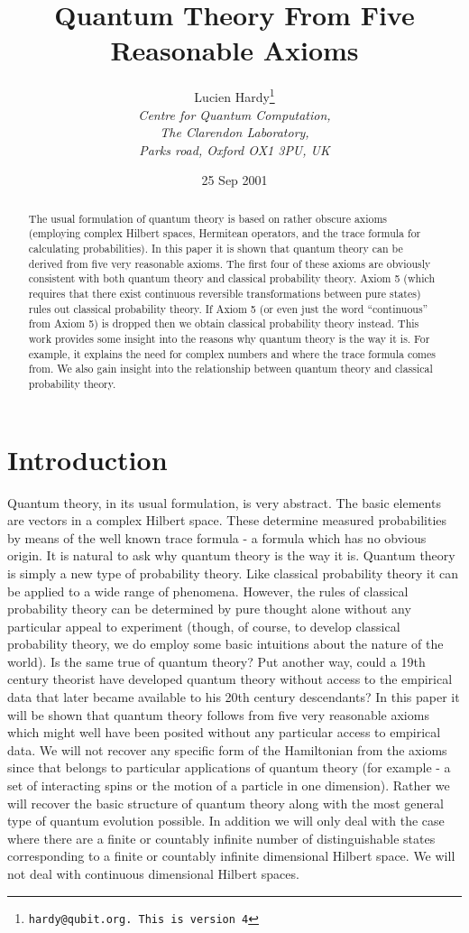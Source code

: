 \documentclass[12pt]{article}
\title{\textbf{Quantum Theory From Five Reasonable Axioms}}
\author{Lucien Hardy\thanks{\texttt{hardy@qubit.org.  This is version
4}}\\
\textit{Centre for Quantum Computation,}\\
\textit{The Clarendon Laboratory,}\\
\textit{Parks road, Oxford OX1 3PU, UK}}
\date{25 Sep 2001}
\begin{document}
\maketitle

\begin{abstract}
The usual formulation of quantum theory is based on rather obscure axioms
(employing complex Hilbert spaces, Hermitean operators, and the trace
formula for calculating probabilities).
In this paper it is shown that quantum theory can be derived from five
very reasonable axioms. The first four of these axioms are obviously
consistent with both quantum theory and classical probability theory.
Axiom 5 (which requires that there exist continuous reversible
transformations between pure states) rules out classical probability
theory.  If Axiom 5 (or even just the word ``continuous'' from Axiom 5)
is dropped then we obtain
classical probability theory instead.  This work provides some insight into
the reasons why quantum theory is the way it is.  For example, it explains
the need for complex numbers and where the trace formula comes from.
We also gain insight into the relationship between quantum theory and
classical probability theory.
\end{abstract}



\newpage

\section{Introduction}

Quantum theory, in its usual formulation, is very abstract.  The basic
elements are vectors in a complex Hilbert space.  These determine
measured probabilities by means of the well known trace formula - a
formula which has no obvious origin.  It is natural to ask
why quantum theory is the way it is.  Quantum theory is simply a new
type of probability theory.  Like classical probability theory it can be
applied to a wide range of phenomena.  However, the rules of classical
probability theory can be determined by pure thought alone without any
particular appeal to experiment (though, of course, to develop
classical probability theory, we do employ some basic intuitions about
the nature of the world).  Is the same true of quantum theory?  Put
another way, could a 19th century theorist have developed quantum theory
without access to the empirical data that later became available to his
20th century descendants? In this paper it will be shown that quantum theory
follows from
five very reasonable axioms which might well have been posited without
any particular access to empirical data.  We will not recover any
specific form of
the Hamiltonian from the axioms since that belongs to particular
applications of quantum theory (for example - a set of interacting spins
or the motion of a particle in one dimension). Rather we will recover
the basic structure of quantum theory along with the most general type
of quantum evolution possible.  In addition we will only deal with the
case where there are a finite or countably infinite number of
distinguishable states corresponding to a finite or countably infinite
dimensional Hilbert space. We will not deal with continuous dimensional
Hilbert spaces.
\end{document}
